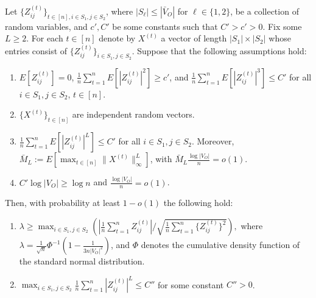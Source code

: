 \documentclass[opre,nonblindrev]{informs3} %
\begin{document}
\begin{APPENDIX}{}
 	\begin{lemma} \label{lem:ozanVersion}{Let $\{Z^{(t)}_{ij}\}_{t\in [n], i\in S_1,j \in S_2 }$,
 			where $|S_\ell|\leq | \bar{V}_O|$
 			for $\ell \in \{1,2\}$, 
 			be a collection of random variables,
 			and $c',C'$ be some constants such that $C'>c'>0$.
 			Fix some $L \geq 2$.
 		}
 		For each $t\in[n]$ denote by
 		$X^{(t)}$  a  vector of length $|S_1| \times |S_2|$ whose entries consist of
 		$\{Z^{(t)}_{ij}\}_{ i\in S_1,j \in S_2 }$.
 		Suppose that the following assumptions hold:
 		\begin{enumerate}[label=A\arabic*.]
 			\item $E[Z^{(t)}_{ij}]=0$, 
 			$\frac{1}{n}\sum_{t=1}^nE[|Z^{(t)}_{ij}|^2]\geq c'$, and
 			$\frac{1}{n}\sum_{t=1}^nE[|Z^{(t)}_{ij}|^3]\leq C'$
 			for all $ i\in S_1,j \in S_2 $, $t\in [n]$.
 			
 			\item $\{X^{(t)}\}_{t\in[n]}$ are independent random vectors.
 			\item 
 			$\frac{1}{n}\sum_{t=1}^nE[|Z^{(t)}_{ij}|^L]\leq C'$
 			for all $ i\in S_1,j \in S_2 $. Moreover,
 			$\bar{M}_L:=E[\max_{t\in[n] } \|X^{(t)}\|_\infty^L ]$,
 			with
 			$ \bar{M}_L \frac{\log |V_O|}{n} = o(1)$. 
 			
 			\item $ C' \log |V_O| \geq  \log n$ and $\frac{\log |V_O|}{n}=o(1)$.
 			
 		\end{enumerate}
 		Then,
 		with probability at least $1-o(1)$
 		the following hold:
 		
 		\begin{enumerate}[label=\roman*.]
 			
 			\item {$\lambda  \geq  \max_{i\in S_1, j\in S_2}
 				\left(
 				{   \left|\frac{1}{n} \sum_{t=1}^n  Z^{(t)}_{ij}  \right| }\Big /{   \sqrt{\frac{1}{n}
 						\sum_{t=1}^n \{Z^{(t)}_{ij} \}^2}}
 				\right),
 				$
 				where
 				$\lambda = \frac{1}{\sqrt{n}}  \Phi^{-1}\left(1-\frac{1}{3n|V_O|^2}\right)$, and $\Phi$
 				denotes the cumulative density function of the standard normal distribution.} 
 			
 			\item 
 			$\max_{i\in S_1,j\in S_2}
 			\frac{1}{n}\sum_{t=1}^n|Z^{(t)}_{ij}|^L
 			\leq C''$  for some constant $C''>0$.
 			
 		\end{enumerate}
 		
 		
 	\end{lemma}
 	

\end{APPENDIX}
\end{document}
